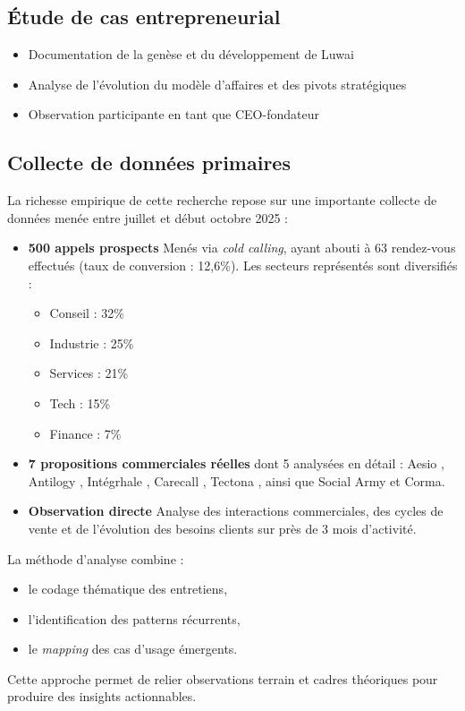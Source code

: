 \subsection{Étude de cas entrepreneurial}
\begin{itemize}
    \item Documentation de la genèse et du développement de Luwai
    \item Analyse de l'évolution du modèle d'affaires et des pivots stratégiques
    \item Observation participante en tant que CEO-fondateur
\end{itemize}

\subsection{Collecte de données primaires}
La richesse empirique de cette recherche repose sur une importante collecte de données menée entre juillet et début octobre 2025 :
\medskip
\begin{itemize}
    \item \textbf{500 appels prospects}  
    Menés via \textit{cold calling}, ayant abouti à 63 rendez-vous effectués (taux de conversion : 12,6\%).  
    Les secteurs représentés sont diversifiés : 
    \begin{itemize}
        \item Conseil : 32\%
        \item Industrie : 25\%
        \item Services : 21\%
        \item Tech : 15\%
        \item Finance : 7\%
    \end{itemize}

    \item \textbf{7 propositions commerciales réelles} dont 5 analysées en détail :  
    Aesio \cite{luwai2025aesio}, Antilogy \cite{luwai2025antilogy}, Intégrhale \cite{luwai2025integrhale}, Carecall \cite{luwai2025carecall}, Tectona \cite{luwai2025tectona}, ainsi que Social Army et Corma.
    
    \item \textbf{Observation directe}  
    Analyse des interactions commerciales, des cycles de vente et de l’évolution des besoins clients sur près de 3 mois d’activité.
\end{itemize}

\medskip
La méthode d’analyse combine :
\begin{itemize}
    \item le codage thématique des entretiens,
    \item l’identification des patterns récurrents,
    \item le \textit{mapping} des cas d’usage émergents.
\end{itemize}
\medskip
Cette approche permet de relier observations terrain et cadres théoriques pour produire des insights actionnables.

